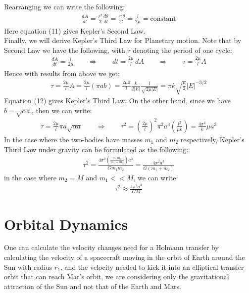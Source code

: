 \documentclass[11pt,oneside]{book}
\theoremstyle{break}
\theoremstyle{break}
\begin{document}
Rearranging we can write the following:
\begin{align*}
\frac{dA}{dt} = \frac{r^2}{2} \frac{d\theta}{dt} = \frac{r^2 \dot{\theta}}{2} = \frac{l}{2\mu} =\text{constant} \tag{11}
\end{align*}
Here equation (11) gives Kepler's Second Law. \\
\hfill\break\hfill\break
Finally, we will derive Kepler's Third Law for Planetary motion. Note that by Second Law we have the following, with $\tau$ denoting the period of one cycle:
\begin{align*}
\frac{dA}{dt} = \frac{l}{2\mu}\qquad \Rightarrow \qquad dt = \frac{2\mu}{l}\, dA \qquad \Rightarrow \qquad \tau = \frac{2\mu}{l}A
\end{align*}
Hence with results from above we get:
\begin{align*}
\tau = \frac{2\mu}{l}A=\frac{2\mu}{l}(\pi ab) = \frac{2\mu \pi}{l}\frac{k}{2|E|}\frac{l}{\sqrt{2\mu |E|}} = \pi k \sqrt{\frac{\mu}{2}}|E|^{-3/2}\tag{12}
\end{align*}
Equation (12) gives Kepler's Third Law. On the other hand, since we have $b = \sqrt{\alpha a}$, then we can write:
\begin{align*}
\tau = \frac{2\mu}{l}\pi a\sqrt{\alpha a} \qquad \Rightarrow \qquad \tau^2 = \left( \frac{2\mu}{l}\right)^2 \pi^2 a^3 \left( \frac{l^2}{\mu k}\right) = \frac{4\pi ^2}{k}\mu a^3 
\end{align*}
In the case where the two-bodies have masses $m_1$ and $m_2$ respectively, Kepler's Third Law under gravity can be formulated as the following:
\begin{align*}
\tau^2 = \frac{4\pi^2\left(\frac{m_1m_2}{m_1+m_2}\right)a^3}{Gm_1 m_2} = \frac{4\pi^2 a^3}{G(m_1+m_2)}
\end{align*}
in the case where $m_2  = M$ and $m_1 <<M$, we can write:
\begin{align*}
\tau^2 \approx \frac{4\pi^2 a^3}{GM}
\end{align*}
\newpage

\section[Orbital Dynamics]{\color{red} Orbital Dynamics \color{black}}
One can calculate the velocity changes need for a Holmann transfer by calculating the velocity of a spacecraft moving in the orbit of Earth around the Sun with radius $r_1$, and the velocity needed to kick it into an elliptical transfer orbit that can reach Mar's orbit, we are considering only the gravitational attraction of the Sun and not that of the Earth and Mars. 
\hfill\break
\end{document}
